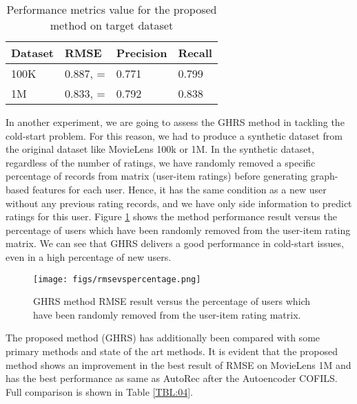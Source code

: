 \documentclass[a4paper,fleqn]{cas-dc}
\begin{document}
\begin{table}[width=\linewidth,cols=4,pos=h]
	\centering
	\caption{Performance metrics value for the proposed method on target dataset}\label{TBL:03}
	\begin{tabular*}{\tblwidth}{llll}
		\toprule
		Dataset & RMSE & Precision & Recall \\
		\midrule
		100K & 0.887, = & 0.771 & 0.799 \\
		1M & 0.833, = & 0.792 & 0.838 \\
		\bottomrule
	\end{tabular*}
\end{table}

In another experiment, we are going to assess the GHRS method in tackling the cold-start problem. For this reason, we had to produce a synthetic dataset from the original dataset like MovieLens 100k or 1M. In the synthetic dataset, regardless of the number of ratings, we have randomly removed a specific percentage of records from matrix  (user-item ratings) before generating graph-based features for each user. Hence, it has the same condition as a new user without any previous rating records, and we have only side information to predict ratings for this user. Figure \ref{FIG:13} shows the method performance result versus the percentage of users which have been randomly removed from the user-item rating matrix. We can see that GHRS delivers a good performance in cold-start issues, even in a high percentage of new users.

\begin{figure}
	\centering
	\texttt{[image: figs/rmsevspercentage.png]}
	\caption{GHRS method RMSE result versus the percentage of users which have been randomly removed from the user-item rating matrix.}
	\label{FIG:13}
\end{figure}

The proposed method (GHRS) has additionally been compared with some primary methods and state of the art methods. It is evident that the proposed method shows an improvement in the best result of RMSE on MovieLens 1M and has the best performance as same as AutoRec after the Autoencoder COFILS. Full comparison is shown in Table \ref{TBL:04}.
\end{document}
